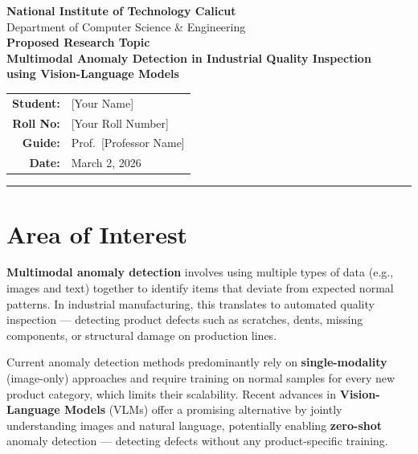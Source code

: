 \documentclass[12pt, a4paper]{article}
\begin{document}
\begin{center}
    {\large \textbf{National Institute of Technology Calicut}}\\[0.2cm]
    {\normalsize Department of Computer Science \& Engineering}\\[0.8cm]
    
    {\Large \textbf{Proposed Research Topic}}\\[0.4cm]
    
    {\large \textbf{Multimodal Anomaly Detection in Industrial Quality Inspection\\ using Vision-Language Models}}\\[0.8cm]
    
    \begin{tabular}{rl}
        \textbf{Student:} & [Your Name] \\
        \textbf{Roll No:} & [Your Roll Number] \\
        \textbf{Guide:} & Prof.\ [Professor Name] \\
        \textbf{Date:} & March 2, 2026 \\
    \end{tabular}
\end{center}

\vspace{0.5cm}
\hrule
\vspace{0.5cm}

\section{Area of Interest}

\textbf{Multimodal anomaly detection} involves using multiple types of data (e.g., images and text) together to identify items that deviate from expected normal patterns. In industrial manufacturing, this translates to automated quality inspection --- detecting product defects such as scratches, dents, missing components, or structural damage on production lines.

Current anomaly detection methods predominantly rely on \textbf{single-modality} (image-only) approaches and require training on normal samples for every new product category, which limits their scalability. Recent advances in \textbf{Vision-Language Models} (VLMs) offer a promising alternative by jointly understanding images and natural language, potentially enabling \textbf{zero-shot} anomaly detection --- detecting defects without any product-specific training.
\end{document}
